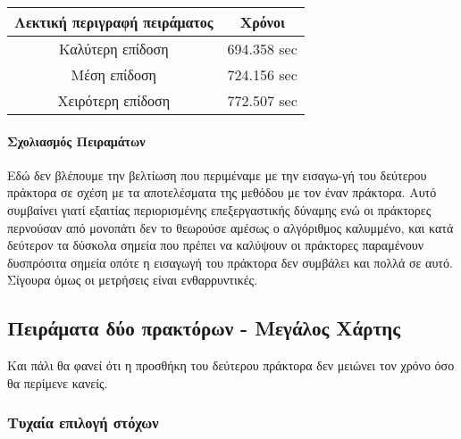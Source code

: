 

\begingroup
\centering
\begin{tabular}{c | c }
	\textbf{Λεκτική περιγραφή πειράματος} & \textbf{Χρόνοι}\\ \hline{}
	Καλύτερη επίδοση & 694.358 sec \\ \hline
	Μέση επίδοση & 724.156 sec   \\ \hline
	Χειρότερη επίδοση & 772.507 sec \\ 
\end{tabular}
\endgroup

\paragraph{Σχολιασμός Πειραμάτων}

Εδώ δεν βλέπουμε την βελτίωση που περιμέναμε με την εισαγω-γή του δεύτερου πράκτορα σε σχέση με τα αποτελέσματα της μεθόδου με τον έναν πράκτορα. Αυτό συμβαίνει γιατί εξαιτίας περιορισμένης επεξεργαστικής δύναμης ενώ οι πράκτορες περνούσαν από μονοπάτι δεν το θεωρούσε αμέσως ο αλγόριθμος καλυμμένο, και κατά δεύτερον τα δύσκολα σημεία που πρέπει να καλύψουν οι πράκτορες παραμένουν δυσπρόσιτα σημεία οπότε η εισαγωγή του πράκτορα δεν συμβάλει και πολλά σε αυτό. Σίγουρα όμως οι μετρήσεις είναι ενθαρρυντικές.

\newpage

\subsection{Πειράματα δύο πρακτόρων - Μεγάλος Χάρτης}

Και πάλι θα φανεί ότι η προσθήκη του δεύτερου πράκτορα δεν μειώνει τον χρόνο όσο θα περίμενε κανείς.

\subsubsection{Τυχαία επιλογή στόχων}

